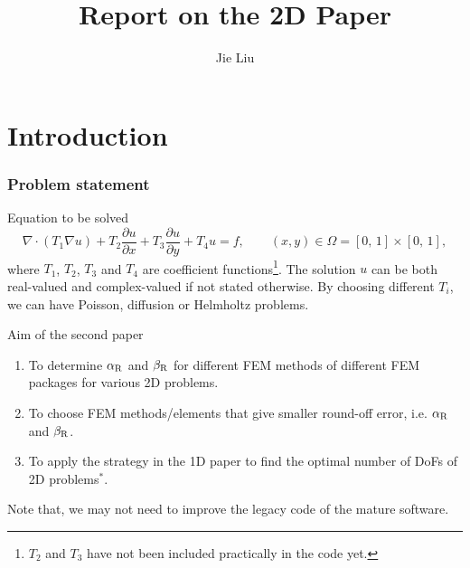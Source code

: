 \documentclass{beamer}
\title[]{Report on the 2D Paper}
\institute[]{Delft University of Technology, the Netherlands}
\author{Jie Liu}
\begin{document}
{
\frame{\titlepage}
}

\section{Introduction}
\begin{frame}
\frametitle{Problem statement}
\vspace{-7em}
\begin{block}{Equation to be solved}
\scriptsize
\begin{equation}
 \nabla \cdot (T_1 \nabla u) + T_2 \frac{\partial{u}}{\partial{x}} + T_3 \frac{\partial{u}}{\partial{y}} + T_4 u = f,\qquad (x,y) \in \Omega = [0,\,1] \times [0,\,1],
 \label{problem_to_be_investigated}
\end{equation}
where $T_1$, $T_2$, $T_3$ and $T_4$ are coefficient functions\footnote{$T_2$ and $T_3$ have not been included practically in the code yet.}. The solution $u$ can be both real-valued and complex-valued if not stated otherwise. By choosing different $T_i$, we can have Poisson, diffusion or Helmholtz problems.
\end{block}
\end{frame}

\begin{frame}{Aim of the second paper}
\vspace{-6em}
\begin{enumerate}
 \item To determine $\alpha_{\rm R}$ and $\beta_{\rm R}$ for different FEM methods of different FEM packages for various 2D problems.
 \item To choose FEM methods/elements that give smaller round-off error, i.e. $\alpha_{\rm R}$ and $\beta_{\rm R}$.
 \item To apply the strategy in the 1D paper to find the optimal number of DoFs of 2D problems$^{*}$.
\end{enumerate}
Note that, we may not need to improve the legacy code of the mature software.
\end{frame}
\end{document}
